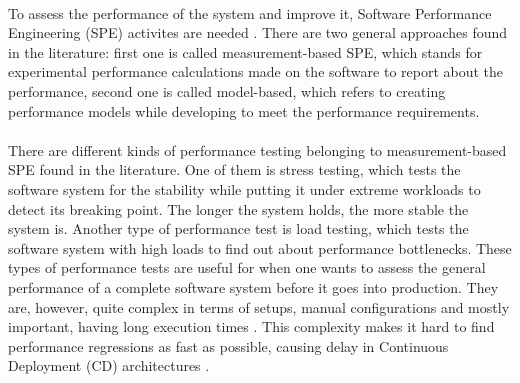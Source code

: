 \documentclass{seal_thesis}
\begin{document}
\\
To assess the performance of the system and improve it, Software Performance Engineering (SPE) activites are needed \cite{Woodside:2007:FSP:1253532.1254717}. There are two general approaches found in the literature: first one is called measurement-based SPE, which stands for experimental performance calculations made on the software to report about the performance, second one is called model-based, which refers to creating performance models while developing to meet the performance requirements\cite{Woodside:2007:FSP:1253532.1254717}. \\ 
\\
There are different kinds of performance testing belonging to measurement-based SPE found in the literature. One of them is stress testing, which tests the software system for the stability while putting it under extreme workloads to detect its breaking point. The longer the system holds, the more stable the system is. Another type of performance test is load testing, which tests the software system with high loads to find out about performance bottlenecks. These types of performance tests are useful for when one wants to assess the general performance of a complete software system before it goes into production. They are, however, quite complex in terms of setups, manual configurations and mostly important, having long execution times \cite{Nguyen:2014:ICS:2597073.2597092}. This complexity makes it hard to find performance regressions as fast as possible, causing delay in Continuous Deployment (CD) architectures \cite{Laaber:2018:EOS:3196398.3196407}.\\
\\
\end{document}
